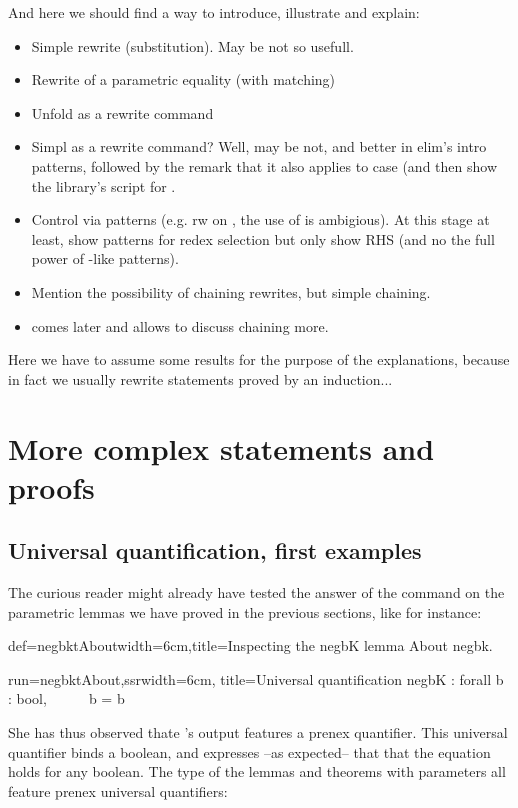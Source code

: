And here we should find a way to introduce, illustrate and explain:
\begin{itemize}
\item Simple rewrite (substitution). May be not so usefull.
\item Rewrite of a parametric equality (with matching)
\item Unfold as a rewrite command
\item Simpl as a rewrite command? Well, may be not, and better in
  elim's intro patterns, followed by the remark that it also applies
  to case (and then show the library's script for .
\item Control via patterns (e.g. rw  on
, the use of  is ambigious). At this
stage at least, show patterns for redex selection but only show RHS
(and no the full power of \C{[X in _ <= X]}-like patterns).
\item Mention the possibility of chaining rewrites, but simple chaining.
\item {} comes later and allows to discuss chaining more.
\end{itemize}

Here we have to assume some results for the purpose of the
explanations, because in fact we usually rewrite statements proved by
an induction...

\section{More complex statements and proofs}

\subsection{Universal quantification, first examples}
The curious reader might already have tested the answer of the
 command on the parametric lemmas we have proved in the
previous sections, like for instance:

\begin{coq}{def=negbktAbout}{width=6cm,title=Inspecting the negbK lemma}
About negbk.
\end{coq}
\begin{coqout}{run=negbktAbout,ssr}{width=6cm, title=Universal quantification}
negbK : forall b : bool, ~~ ~~ b = b
\end{coqout}

She has thus observed thate \Coq{}'s output features a prenex
 quantifier. This universal quantifier binds a boolean, and
expresses --as expected-- that that the equation holds for any
boolean. The type of the lemmas and theorems with parameters all feature
prenex universal quantifiers:

